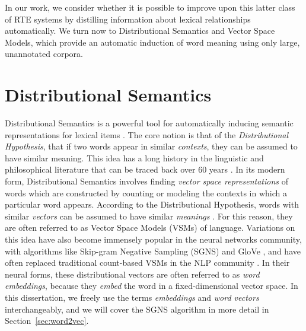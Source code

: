 In our work, we consider whether it is possible to improve upon this latter
class of RTE systems by distilling information about lexical relationships
automatically. We turn now to Distributional Semantics and Vector Space Models,
which provide an automatic induction of word meaning using only large,
unannotated corpora.

\section{Distributional Semantics}
\label{sec:dist}

Distributional Semantics is a powerful tool for automatically inducing semantic
representations for lexical items \cite{turney:2010:jair,erk:2012:llc}.  The
core notion is that of the {\em Distributional Hypothesis}, that if two words
appear in similar {\em contexts}, they can be assumed to have similar meaning.
This idea has a long history in the linguistic and philosophical literature that
can be traced back over 60 years
\cite{wittgenstein:1953:pi,harris:1954:word,firth:1957:la}. In its modern form,
Distributional Semantics involves finding {\em vector space representations} of
words which are constructed by counting or modeling the contexts in which a
particular word appears. According to the Distributional Hypothesis, words
with similar {\em vectors} can be assumed to have similar {\em meanings}
\cite{turney:2010:jair}. For this reason, they are often referred to as
Vector Space Models (VSMs) of language. Variations on this idea have also
become immensely popular in the neural networks community, with algorithms
like Skip-gram Negative Sampling (SGNS) \cite{mikolov:2013:iclr} and GloVe
\cite{pennington:2014:emnlp}, and have often replaced traditional count-based
VSMs in the NLP community \cite{baroni:2014:acl}. In their neural forms,
these distributional vectors are often referred to as {\em word embeddings},
because they {\em embed} the word in a fixed-dimensional vector space. In this
dissertation, we freely use the terms {\em embeddings} and {\em word vectors}
interchangeably, and we will cover the SGNS algorithm in more detail in
Section~\ref{sec:word2vec}.

